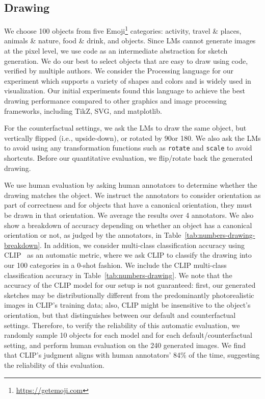 \subsection{Drawing} \label{sec:drawing-setup}

We choose 100 objects from five Emoji\footnote{\url{https://getemoji.com}} categories: activity, travel \& places, animals \& nature, food \& drink, and objects. 
Since LMs cannot generate images at the pixel level, we use code as an intermediate abstraction for sketch generation. We do our best to select objects that are easy to draw using code, verified by multiple authors. 
We consider the Processing language for our experiment which supports a variety of shapes and colors and is widely used in visualization. Our initial experiments found this language to achieve the best drawing performance compared to other graphics and image processing frameworks, including TikZ, SVG, and matplotlib. 

For the counterfactual settings, we ask the LMs to draw the same object, but vertically flipped (i.e., upside-down), or rotated by 90\textdegree or 180\textdegree. We also ask the LMs to avoid using any transformation functions such as \texttt{rotate} and \texttt{scale} to avoid shortcuts.
Before our quantitative evaluation, we flip/rotate back the generated drawing.

We use human evaluation by asking human annotators to determine whether the drawing matches the object. We instruct the annotators to consider orientation as part of correctness and for objects that have a canonical orientation, they must be drawn in that orientation. We average the results over 4 annotators. We also show a breakdown of accuracy depending on whether an object has a canonical orientation or not, as judged by the annotators, in Table~\ref{tab:numbers-drawing-breakdown}. In addition, we consider multi-class classification accuracy using CLIP~\cite{clip} as an automatic metric, where we ask CLIP to classify the drawing into our 100 categories in a 0-shot fashion. We include the CLIP multi-class classification accuracy in Table~\ref{tab:numbers-drawing}.
We note that the accuracy of the CLIP model for our setup is not guaranteed: first, our generated sketches may be distributionally different from the predominantly photorealistic images in CLIP's training data; also, CLIP might be insensitive to the object's orientation, but that distinguishes between our default and counterfactual settings. Therefore, to verify the reliability of this automatic evaluation, we randomly sample 10 objects for each model and for each default/counterfactual setting, and perform human evaluation on the 240 generated images. We find that CLIP's judgment aligns with human annotators' 84\% of the time, suggesting the reliability of this evaluation.

